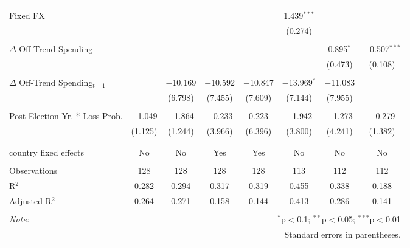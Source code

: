 \begin{tabular}{@{\extracolsep{5pt}}lccccccc}
  & & & & & & & \\ 
 Fixed FX &  &  &  &  & 1.439$^{***}$ &  &  \\ 
  &  &  &  &  & (0.274) &  &  \\ 
  & & & & & & & \\ 
 $\Delta$ Off-Trend Spending &  &  &  &  &  & 0.895$^{*}$ & $-$0.507$^{***}$ \\ 
  &  &  &  &  &  & (0.473) & (0.108) \\ 
  & & & & & & & \\ 
 $\Delta$ Off-Trend Spending$_{t-1}$ &  & $-$10.169 & $-$10.592 & $-$10.847 & $-$13.969$^{*}$ & $-$11.083 &  \\ 
  &  & (6.798) & (7.455) & (7.609) & (7.144) & (7.955) &  \\ 
  & & & & & & & \\ 
 Post-Election Yr. * Loss Prob. & $-$1.049 & $-$1.864 & $-$0.233 & 0.223 & $-$1.942 & $-$1.273 & $-$0.279 \\ 
  & (1.125) & (1.244) & (3.966) & (6.396) & (3.800) & (4.241) & (1.382) \\ 
  & & & & & & & \\ 
\hline \\[-1.8ex] 
country fixed effects & No & No & Yes & Yes & No & No & No \\ 
\hline \\[-1.8ex] 
Observations & 128 & 128 & 128 & 128 & 113 & 112 & 112 \\ 
R$^{2}$ & 0.282 & 0.294 & 0.317 & 0.319 & 0.455 & 0.338 & 0.188 \\ 
Adjusted R$^{2}$ & 0.264 & 0.271 & 0.158 & 0.144 & 0.413 & 0.286 & 0.141 \\ 
\hline 
\hline \\[-1.8ex] 
\textit{Note:}  & \multicolumn{7}{r}{$^{*}$p$<$0.1; $^{**}$p$<$0.05; $^{***}$p$<$0.01} \\ 
 & \multicolumn{7}{r}{Standard errors in parentheses.} \\ 
\end{tabular} 
\endgroup 
